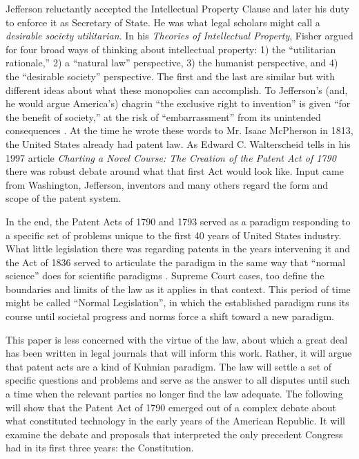 \documentclass[pdftex,12pt,letterpaper]{article}
\begin{document}
Jefferson reluctantly accepted the Intellectual Property Clause and later his duty to enforce it as Secretary of State. He was what legal scholars might call a \emph{desirable society utilitarian}. In his \emph{Theories of Intellectual Property}, Fisher argued for four broad ways of thinking about intellectual property: 1) the ``utilitarian rationale,'' 2) a ``natural law'' perspective, 3) the humanist perspective, and 4) the ``desirable society'' perspective. The first and the last are similar but with different ideas about what these monopolies can accomplish. To Jefferson's (and, he would argue America's) chagrin ``the exclusive right to invention'' is given ``for the benefit of society,'' at the risk of ``embarrassment'' from its unintended consequences \autocite{Jefferson1813}. At the time he wrote these words to Mr. Isaac McPherson in 1813, the United States already had patent law. As Edward C. Walterscheid tells in his 1997 article \emph{Charting a Novel Course: The Creation of the Patent Act of 1790} there was robust debate around what that first Act would look like. Input came from Washington, Jefferson, inventors and many others regard the form and scope of the patent system.

In the end, the Patent Acts of 1790 and 1793 served as a paradigm responding to a specific set of problems unique to the first 40 years of United States industry. What little legislation there was regarding patents in the years intervening it and the Act of 1836 served to articulate the paradigm in the same way that ``normal science'' does for scientific paradigms \autocite{Kuhn1962}. Supreme Court cases, too define the boundaries and limits of the law as it applies in that context. This period of time might be called ``Normal Legislation'', in which the established paradigm runs its course until societal progress and norms force a shift toward a new paradigm.

This paper is less concerned with the virtue of the law, about which a great deal has been written in legal journals that will inform this work. Rather, it will argue that patent acts are a kind of Kuhnian paradigm. The law will settle a set of specific questions and problems and serve as the answer to all disputes until such a time when the relevant parties no longer find the law adequate. The following will show that the Patent Act of 1790 emerged out of a complex debate about what constituted technology in the early years of the American Republic. It will examine the debate and proposals that interpreted the only precedent Congress had in its first three years: the Constitution.
\end{document}

